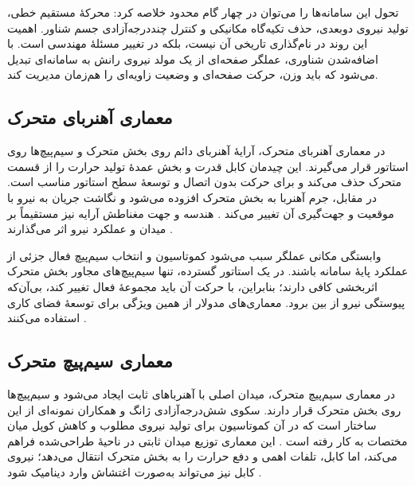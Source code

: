 تحول این سامانه‌ها را می‌توان در چهار گام محدود خلاصه کرد: محرکهٔ مستقیم خطی، تولید نیروی دوبعدی، حذف تکیه‌گاه مکانیکی و کنترل چنددرجه‌آزادی جسم شناور. اهمیت این روند در نام‌گذاری تاریخی آن نیست، بلکه در تغییر مسئلهٔ مهندسی است. با اضافه‌شدن شناوری، عملگر صفحه‌ای از یک مولد نیروی رانش به سامانه‌ای تبدیل می‌شود که باید وزن، حرکت صفحه‌ای و وضعیت زاویه‌ای را هم‌زمان مدیریت کند.

\subsection{معماری آهنربای متحرک}
\label{subsubsec:moving_magnet}

در معماری آهنربای متحرک، آرایهٔ آهنربای دائم روی بخش متحرک و سیم‌پیچ‌ها روی استاتور قرار می‌گیرند. این چیدمان کابل قدرت و بخش عمدهٔ تولید حرارت را از قسمت متحرک حذف می‌کند و برای حرکت بدون اتصال و توسعهٔ سطح استاتور مناسب است. در مقابل، جرم آهنربا به بخش متحرک افزوده می‌شود و نگاشت جریان به نیرو با موقعیت و جهت‌گیری آن تغییر می‌کند \cite{jansenModelingMagneticallyLevitated2007,hu6DOFExtendedUnified2024}. هندسه و جهت مغناطش آرایه نیز مستقیماً بر میدان و عملکرد نیرو اثر می‌گذارند \cite{wangMagnetArrayPlanar2020,wangAnalysisOptimizationMoving2025}.

وابستگی مکانی عملگر سبب می‌شود کموتاسیون و انتخاب سیم‌پیچ فعال جزئی از عملکرد پایهٔ سامانه باشند. در یک استاتور گسترده، تنها سیم‌پیچ‌های مجاور بخش متحرک اثربخشی کافی دارند؛ بنابراین، با حرکت آن باید مجموعهٔ فعال تغییر کند، بی‌آن‌که پیوستگی نیرو از بین برود. معماری‌های مدولار از همین ویژگی برای توسعهٔ فضای کاری استفاده می‌کنند \cite{xuModularMaglevDesign2024d,takahashiDevelopmentPlanarStage2025}.

\subsection{معماری سیم‌پیچ متحرک}
\label{subsubsec:moving_coil}

در معماری سیم‌پیچ متحرک، میدان اصلی با آهنرباهای ثابت ایجاد می‌شود و سیم‌پیچ‌ها روی بخش متحرک قرار دارند. سکوی شش‌درجه‌آزادی ژانگ و همکاران نمونه‌ای از این ساختار است که در آن کموتاسیون برای تولید نیروی مطلوب و کاهش کوپل میان مختصات به کار رفته است \cite{zhangDecouplingLevitationControl2012}. این معماری توزیع میدان ثابتی در ناحیهٔ طراحی‌شده فراهم می‌کند، اما کابل، تلفات اهمی و دفع حرارت را به بخش متحرک انتقال می‌دهد؛ نیروی کابل نیز می‌تواند به‌صورت اغتشاش وارد دینامیک شود \cite{nakataDriveStabilizationMultidegreeoffreedom2025}.

